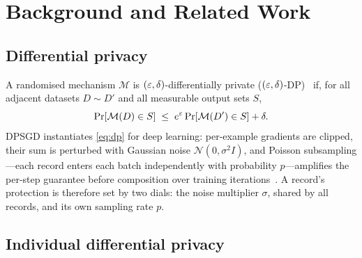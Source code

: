 \section{Background and Related Work}
\label{sec:background}

\subsection{Differential privacy}
\label{sec:dp}

A randomised mechanism $\mathcal{M}$ is $(\varepsilon,
\delta)$-differentially private
($(\varepsilon,\delta)$-DP)~\cite{dwork2006calibrating} if, for all adjacent
datasets $D \sim D'$ and all measurable output sets $S$,
\begin{equation}
\Pr[\mathcal{M}(D) \in S] \;\leq\; e^\varepsilon \Pr[\mathcal{M}(D') \in S] +
\delta .
\label{eq:dp}
\end{equation}
\ac{DPSGD} instantiates \cref{eq:dp} for deep learning: per-example
gradients are clipped, their sum is perturbed with Gaussian noise
$\mathcal{N}(0, \sigma^2 I)$, and Poisson subsampling---each record
enters each batch independently with probability $p$---amplifies the
per-step guarantee before composition over training
iterations~\cite{abadi2016deep}. A record's protection is therefore
set by two dials: the noise multiplier $\sigma$, shared by all
records, and its own sampling rate $p$.

\subsection{Individual differential privacy}
\label{sec:idp}

